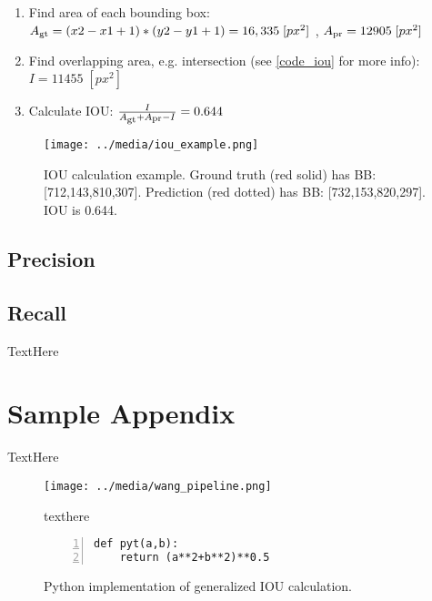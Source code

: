 \def \pxpx {\; [px^2]}
\def \Asub #1{A\textsubscript{#1}}
\begin{enumerate}\itemsep=-0.5em

\item Find area of each bounding box: \\ $\Asub{gt} = (x2-x1+1)*(y2-y1+1) = 16,335 \pxpx $ , $ \Asub{pr} = 12905 \pxpx $

\item Find overlapping area, e.g. intersection (see \ref{code_iou} for more info): $I = 11455 \pxpx $

\item Calculate IOU: $\frac{I}{\Asub{gt} + \Asub{pr} - I} = 0.644 $
\end{enumerate}

\begin{figure}[h] %
    \centering
    \texttt{[image: ../media/iou\_example.png]}
    \caption{IOU calculation example. Ground truth (red solid) has BB: [712,143,810,307]. Prediction (red dotted) has BB: [732,153,820,297]. IOU is 0.644.}
    \label{iou_example} %
\end{figure}


\subsection{Precision}


\subsection{Recall}
TextHere










\section{Sample Appendix}
TextHere

\begin{figure}[h] %
    \texttt{[image: ../media/wang\_pipeline.png]}
    \caption{texthere}
    \label{delme_figure} %
\end{figure}


\begin{figure}[h] %
\begin{lstlisting}[numbers=left]
def pyt(a,b):
    return (a**2+b**2)**0.5
\end{lstlisting}
\onehalfspacing %
\caption{Python implementation of generalized IOU calculation.}
\label{delme_code} %
\end{figure}
